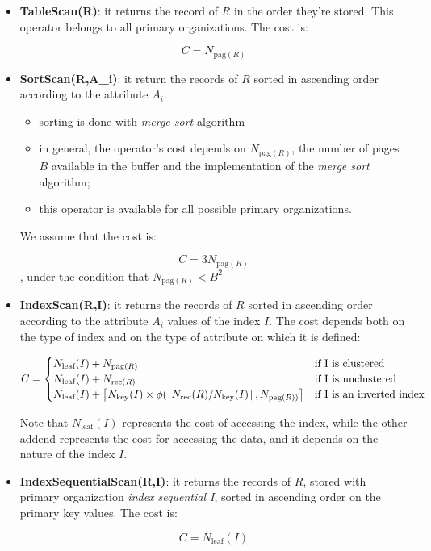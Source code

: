 \begin{itemize}
    \item \textbf{TableScan(R)}: it returns the record of $R$ in the order they're stored. This operator belongs to all primary organizations. The cost is:

    $$
    C = N_{\text{pag}(R)}
    $$

    \item \textbf{SortScan(R,A\_i)}: it return the records of $R$ sorted in ascending order according to the attribute $A_i$.
    \begin{itemize}
        \item sorting is done with \textit{merge sort} algorithm
        \item in general, the operator's cost depends on $N_{\text{pag}(R)}$, the number of pages $B$ available in the buffer and the implementation of the \textit{merge sort} algorithm;
        \item this operator is available for all possible primary organizations.
    \end{itemize}
    We assume that the cost is:

    $$
    C = 3N_{\text{pag}(R)}
    $$
    , under the condition that $N_{\text{pag}(R)} < B^2$

    \item \textbf{IndexScan(R,I)}: it returns the records of $R$ sorted in ascending order according to the attribute $A_i$ values of the index $I$. The cost depends both on the type of index and on the type of attribute on which it is defined:

    $$
    C = \begin{cases}
        N_{\text{leaf}}(I) + N_{\text{pag}(R)} & \mbox{if} \text{ I is clustered} \\
        N_{\text{leaf}}(I) + N_{\text{rec}(R)} & \mbox{if} \text{ I is unclustered} \\
        N_{\text{leaf}}(I) + \ceil*{N_{\text{key}}(I) \times \phi (\ceil*{N_{\text{rec}}(R)/N_{\text{key}}(I)}, N_{\text{pag}(R))}} & \mbox{if} \text{ I is an inverted index}
        \end{cases}
    $$

    Note that $N_{\text{leaf}}(I)$ represents the cost of accessing the index, while the other addend represents the cost for accessing the data, and it depends on the nature of the index $I$.

    \item \textbf{IndexSequentialScan(R,I)}: it returns the records of $R$, stored with primary organization \textit{index sequential I}, sorted in ascending order on the primary key values. The cost is:

    $$
    C = N_{\text{leaf}}(I)
    $$
    
\end{itemize}

